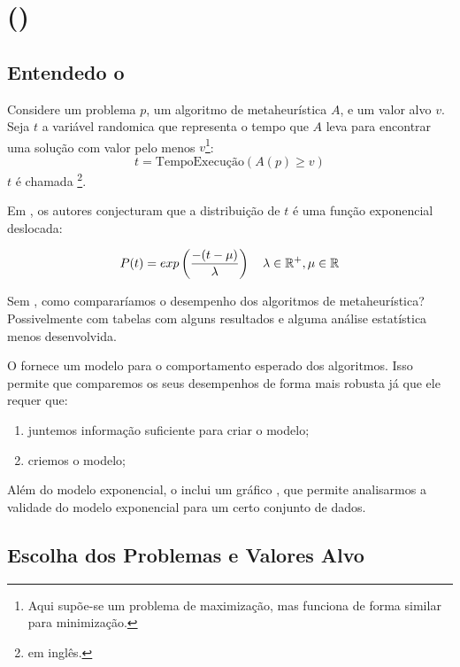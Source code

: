 \section{\tttfull (\ttt)}

\subsection{Entendedo o \ttt}
\label{subsection:understanding-ttt}

Considere um problema $p$, um algoritmo de metaheurística $A$, e um valor alvo $v$. Seja $t$ a variável randomica que representa o tempo que $A$ leva para encontrar uma solução com valor pelo menos $v$\footnote{Aqui supõe-se um problema de maximização, mas funciona de forma similar para minimização.}:
\begin{equation}
    t = \mbox{TempoExecução}(A(p) \geqslant v)
\end{equation}
$t$ é chamada \tttvar\footnote{\tttvaren em inglês.}.

Em \cite{bib:ttt}, os autores conjecturam que a distribuição de $t$ é uma função exponencial deslocada:

\begin{equation}
    P(t) = exp\left(\dfrac{-(t-\mu)}{\lambda}\right)
    \quad \lambda \in \mathbb{R}^+, \mu \in \mathbb{R}
\end{equation}

Sem \ttt, como compararíamos o desempenho dos algoritmos de metaheurística? Possivelmente com tabelas com alguns resultados e alguma análise estatística menos desenvolvida.

O \ttt fornece um modelo para o comportamento esperado dos algoritmos. Isso permite que comparemos os seus desempenhos de forma mais robusta já que ele requer que:

\begin{enumerate}
    \item juntemos informação suficiente para criar o modelo;
    \item criemos o modelo;
\end{enumerate}

Além do modelo exponencial, o \ttt inclui um gráfico \qq, que permite analisarmos a validade do modelo exponencial para um certo conjunto de dados.

\subsection{Escolha dos Problemas e Valores Alvo}
\label{subsection:problems-target-values}

